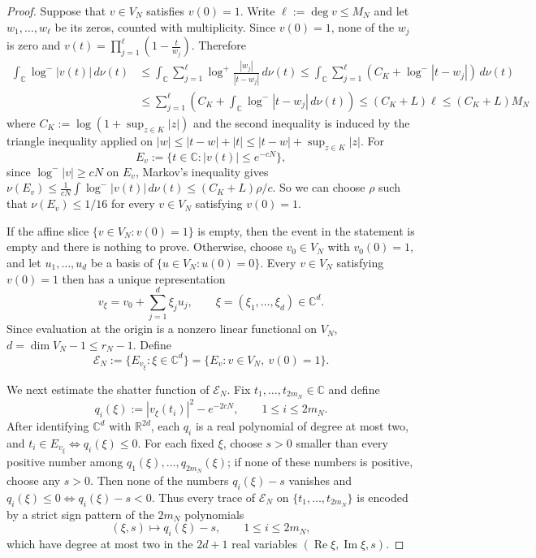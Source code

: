 \documentclass[10pt,reqno]{amsart}
\theoremstyle{remark}
\newcommand{\C}{\mathbb C}
\newcommand{\R}{\mathbb R}
\newcommand{\logm}{\log^-}
\newcommand{\logp}{\log^+}
\begin{document}
\begin{proof}
Suppose that $v\in V_N$ satisfies $v(0)=1$. Write $\ell:=\deg v\le M_N$ and let $w_1,\ldots,w_\ell$ be its zeros, counted with multiplicity. Since $v(0)=1$, none of the $w_j$ is zero and $v(t)=\prod_{j=1}^{\ell}\left(1-\frac{t}{w_j}\right)$.
Therefore
\begin{align*}
    \int_\C\logm|v(t)|\,d\nu(t) 
    &\le \int_\C\sum_{j=1}^\ell \logp\frac{|w_j|}{|t-w_j|}\,d\nu(t)
    \le \int_\C\sum_{j=1}^\ell (C_K+\logm|t-w_j|)\,d\nu(t)\\
    &\le \sum_{j=1}^{\ell} \left(C_K+\int_\C\logm|t-w_j|\,d\nu(t)\right) 
    \le (C_K+L)\ell
    \le (C_K+L)M_N
\end{align*}
where $C_K:=\log(1+\sup_{z\in K}|z|)$ and the second inequality is induced by the triangle inequality applied on $|w|\le |t-w|+|t|\le|t-w|+\sup_{z\in K}|z|$. For
\[E_v:=\{t\in\C:|v(t)|\le e^{-cN}\},\]
since $\log^-|v|\geq cN$ on $E_v$, Markov's inequality gives $\nu(E_v)\le \frac{1}{cN}\int \logm |v(t)|\, d\nu(t)\le (C_K+L)\rho/c$. So we can choose $\rho$ such that $\nu(E_v)\le 1/16$ for every $v\in V_N$ satisfying $v(0)=1$.

If the affine slice $\{v\in V_N:v(0)=1\}$ is empty, then the event in the statement is empty and there is nothing to prove. Otherwise, choose $v_0\in V_N$ with $v_0(0)=1$, and let $u_1,\ldots,u_d$ be a basis of $\{u\in V_N:u(0)=0\}$. Every $v\in V_N$ satisfying $v(0)=1$ then has a unique representation
\[v_\xi = v_0+\sum_{j=1}^d\xi_j u_j, \qquad
    \xi=(\xi_1,\ldots,\xi_d)\in\C^d.\]
Since evaluation at the origin is a nonzero linear functional on $V_N$, $d=\dim V_N-1\le r_N-1$. Define
\[\mathcal E_N := \{E_{v_\xi}:\xi\in\C^d\} = \{E_v:v\in V_N,\ v(0)=1\}.\]

We next estimate the shatter function of $\mathcal E_N$. Fix $t_1,\ldots,t_{2m_N}\in\C$ and define
\[q_i(\xi) := |v_\xi(t_i)|^2-e^{-2cN}, \qquad 1\le i\le2m_N.\]
After identifying $\C^d$ with $\R^{2d}$, each $q_i$ is a real polynomial
of degree at most two, and $t_i\in E_{v_\xi} \iff q_i(\xi)\le0$. For each fixed $\xi$, choose $s>0$ smaller than every positive number among $q_1(\xi),\ldots,q_{2m_N}(\xi)$; if none of these numbers is positive, choose any $s>0$. Then none of the numbers $q_i(\xi)-s$ vanishes and $q_i(\xi)\le0 \iff q_i(\xi)-s<0$.
Thus every trace of $\mathcal E_N$ on $\{t_1,\ldots,t_{2m_N}\}$ is encoded by a strict sign pattern of the $2m_N$ polynomials
\[(\xi,s)\mapsto q_i(\xi)-s,
    \qquad 1\le i\le2m_N,\]
which have degree at most two in the $2d+1$ real variables $(\operatorname{Re}\xi,\operatorname{Im}\xi,s)$.


\end{proof}
\end{document}
